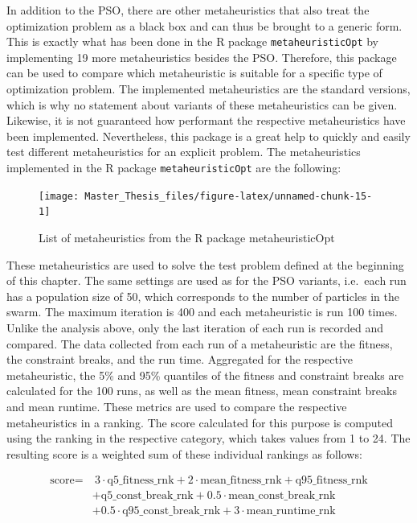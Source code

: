 \documentclass[
  oneside, a4paper, 12pt, openany]{book}
\theoremstyle{definition}
\theoremstyle{definition}
\theoremstyle{definition}
\theoremstyle{definition}
\theoremstyle{remark}
\begin{document}
In addition to the PSO, there are other metaheuristics that also treat the optimization problem as a black box and can thus be brought to a generic form. This is exactly what has been done in the R package \texttt{metaheuristicOpt} by implementing 19 more metaheuristics besides the PSO. Therefore, this package can be used to compare which metaheuristic is suitable for a specific type of optimization problem. The implemented metaheuristics are the standard versions, which is why no statement about variants of these metaheuristics can be given. Likewise, it is not guaranteed how performant the respective metaheuristics have been implemented. Nevertheless, this package is a great help to quickly and easily test different metaheuristics for an explicit problem. The metaheuristics implemented in the R package \texttt{metaheuristicOpt} are the following:

\begin{figure}[H]
\texttt{[image: Master\_Thesis\_files/figure-latex/unnamed-chunk-15-1]} \caption{List of metaheuristics from the R package metaheuristicOpt}\label{fig:unnamed-chunk-15}
\end{figure}

These metaheuristics are used to solve the test problem defined at the beginning of this chapter. The same settings are used as for the PSO variants, i.e.~each run has a population size of 50, which corresponds to the number of particles in the swarm. The maximum iteration is 400 and each metaheuristic is run 100 times. Unlike the analysis above, only the last iteration of each run is recorded and compared. The data collected from each run of a metaheuristic are the fitness, the constraint breaks, and the run time. Aggregated for the respective metaheuristic, the 5\% and 95\% quantiles of the fitness and constraint breaks are calculated for the 100 runs, as well as the mean fitness, mean constraint breaks and mean runtime. These metrics are used to compare the respective metaheuristics in a ranking. The score calculated for this purpose is computed using the ranking in the respective category, which takes values from 1 to 24. The resulting score is a weighted sum of these individual rankings as follows:

\begin{align*}
\text{score} =& \ 3 \cdot \text{q5\_fitness\_rnk} + 2 \cdot \text{mean\_fitness\_rnk} + \text{q95\_fitness\_rnk}\\ 
&+ \text{q5\_const\_break\_rnk} + 0.5 \cdot \text{mean\_const\_break\_rnk} \\
&+ 0.5 \cdot \text{q95\_const\_break\_rnk} + 3 \cdot \text{mean\_runtime\_rnk}
\end{align*}
\end{document}
